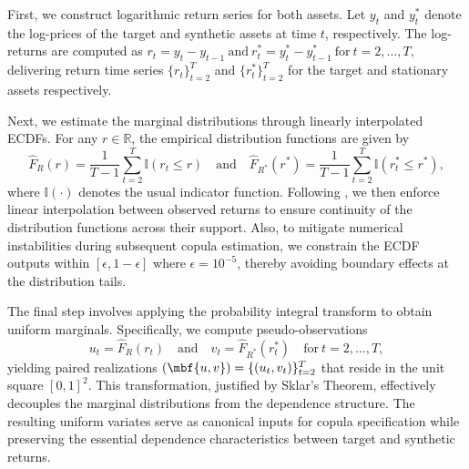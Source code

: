 First, we construct logarithmic return series for both assets. Let $y_t$ and $y_t^*$ denote the log-prices of the target and synthetic assets at time $t$, respectively. The log-returns are computed as  
$
r_t = y_t - y_{t-1} 
~\text{and}~ 
r_t^* = y_t^* - y_{t-1}^* 
~\text{for}\ t = 2,\ldots,T,
$  
delivering return time series $\{r_t\}_{t=2}^T$ and $\{r_t^*\}_{t=2}^T$ for the target and stationary assets respectively. 

Next, we estimate the marginal distributions through linearly interpolated ECDFs. For any $r \in \mathbb{R}$, the empirical distribution functions are given by  
$$
\hat{F}_{R}(r) = \frac{1}{T-1} \sum_{t=2}^T \mathbb{I}(r_t \leq r) \quad \text{and} \quad \hat{F}_{R^*}(r^*) = \frac{1}{T-1} \sum_{t=2}^T \mathbb{I}(r_t^* \leq r^*),
$$  
where $\mathbb{I}(\cdot)$ denotes the usual indicator function. Following \cite{hudsonthames2024}, we then enforce linear interpolation between observed returns to ensure continuity of the distribution functions across their support. Also, to mitigate numerical instabilities during subsequent copula estimation, we constrain the ECDF outputs within $[\epsilon, 1-\epsilon]$ where $\epsilon = 10^{-5}$, thereby avoiding boundary effects at the distribution tails.

The final step involves applying the probability integral transform to obtain uniform marginals. Specifically, we compute pseudo-observations  
$$
u_t = \hat{F}_R(r_t) \quad \text{and} \quad v_t = \hat{F}_{R^*}(r_t^*) \quad \text{for}\ t = 2,\ldots,T,
$$  
yielding paired realizations $(\mbf {u,v})=\{(u_t,v_t)\}_{t=2}^T$ that reside in the unit square $[0,1]^2$. This transformation, justified by Sklar's Theorem, effectively decouples the marginal distributions from the dependence structure. The resulting uniform variates serve as canonical inputs for copula specification while preserving the essential dependence characteristics between target and synthetic returns. 



